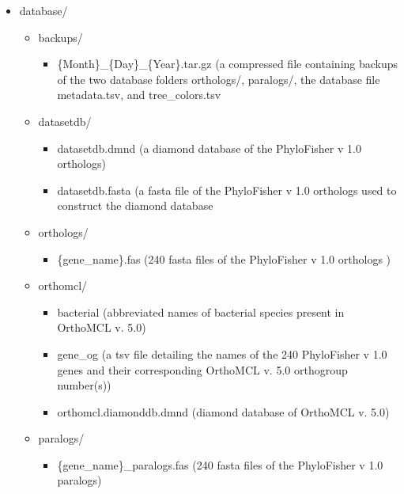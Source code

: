 \documentclass{article}
\begin{document}
        \begin{itemize}
            \item database/
                \begin{itemize}
                    \item backups/
                        \begin{itemize}
                            \item \{Month\}\_\{Day\}\_\{Year\}.tar.gz (a compressed file containing backups of the two database folders orthologs/, paralogs/, the database file metadata.tsv, and tree\_colors.tsv
                        \end{itemize}
                    \item datasetdb/
                        \begin{itemize}
                            \item datasetdb.dmnd (a diamond database of the PhyloFisher v 1.0 orthologs)
                            \item datasetdb.fasta (a fasta file of the PhyloFisher v 1.0 orthologs used to construct the diamond database
                        \end{itemize}
                    \item orthologs/
                        \begin{itemize}
                            \item \{gene\_name\}.fas (240 fasta files of the PhyloFisher v 1.0 orthologs )
                        \end{itemize}
                    \item orthomcl/
                        \begin{itemize}
                            \item bacterial (abbreviated names of bacterial species present in OrthoMCL v. 5.0)
                            \item gene\_og (a tsv file detailing the names of the 240 PhyloFisher v 1.0 genes and their corresponding  OrthoMCL v. 5.0 orthogroup number(s))
                            \item orthomcl.diamonddb.dmnd (diamond database of OrthoMCL v. 5.0)
                        \end{itemize}
                    \item paralogs/
                        \begin{itemize}
                            \item \{gene\_name\}\_paralogs.fas (240 fasta files of the PhyloFisher v 1.0 paralogs)

\end{itemize}
\end{itemize}
\end{itemize}
\end{document}
